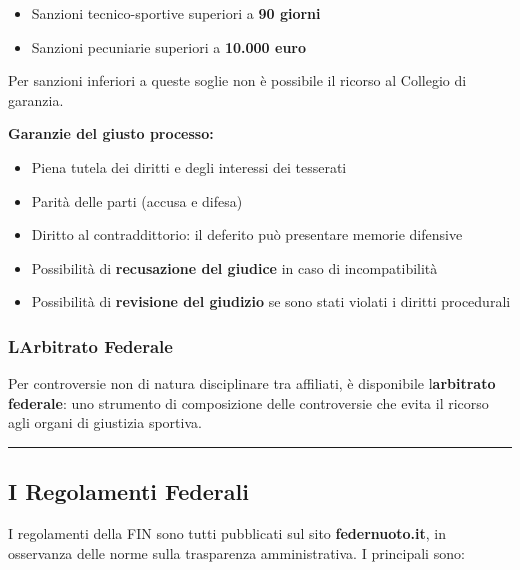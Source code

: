\documentclass[a4paper,11pt]{article}
\providecommand{\tightlist}{%
  \setlength{\itemsep}{0pt}\setlength{\parskip}{0pt}}
\begin{document}
\begin{itemize}
      \tightlist
      \item
            Sanzioni tecnico-sportive superiori a \textbf{90 giorni}
      \item
            Sanzioni pecuniarie superiori a \textbf{10.000 euro}
\end{itemize}

Per sanzioni inferiori a queste soglie non è possibile il ricorso al
Collegio di garanzia.

\textbf{Garanzie del giusto processo:}

\begin{itemize}
      \tightlist
      \item
            Piena tutela dei diritti e degli interessi dei tesserati
      \item
            Parità delle parti (accusa e difesa)
      \item
            Diritto al contraddittorio: il deferito può presentare memorie
            difensive
      \item
            Possibilità di \textbf{recusazione del giudice} in caso di
            incompatibilità
      \item
            Possibilità di \textbf{revisione del giudizio} se sono stati violati i
            diritti procedurali
\end{itemize}

\subsubsection{L\textquotesingle Arbitrato
      Federale}\label{larbitrato-federale}

Per controversie non di natura disciplinare tra affiliati, è disponibile
l\textquotesingle{}\textbf{arbitrato federale}: uno strumento di
composizione delle controversie che evita il ricorso agli organi di
giustizia sportiva.

\begin{center}\rule{0.5\linewidth}{0.5pt}\end{center}

\subsection{I Regolamenti Federali}\label{i-regolamenti-federali}

I regolamenti della FIN sono tutti pubblicati sul sito
\textbf{federnuoto.it}, in osservanza delle norme sulla trasparenza
amministrativa. I principali sono:
\end{document}
